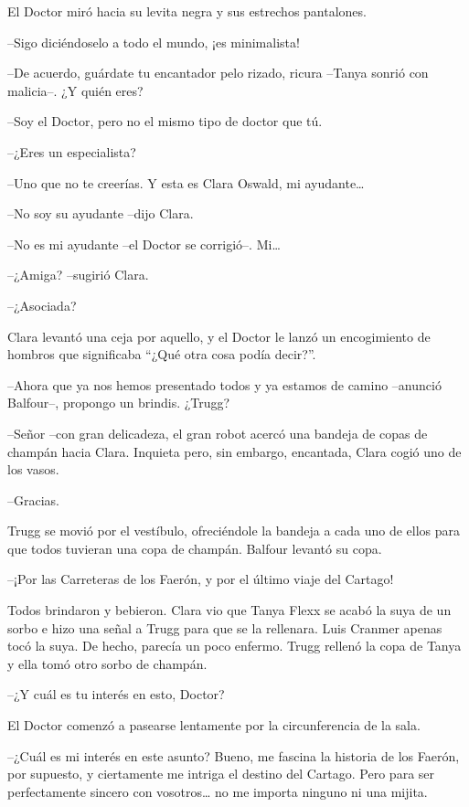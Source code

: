 {El Doctor miró hacia su levita negra y sus estrechos pantalones.}

{--Sigo diciéndoselo a todo el mundo, ¡es minimalista!}

{--De acuerdo, guárdate tu encantador pelo rizado, ricura --Tanya sonrió
con malicia--. ¿Y quién eres?}

{--Soy el Doctor, pero no el mismo tipo de doctor que tú.}

{--¿Eres un especialista?}

{--Uno que no te creerías. Y esta es Clara Oswald, mi ayudante\ldots{}}

{--No soy su ayudante --dijo Clara.}

{--No es mi ayudante --el Doctor se corrigió--. Mi\ldots{}}

{--¿Amiga? --sugirió Clara.}

{--¿Asociada?}

{Clara levantó una ceja por aquello, y el Doctor le lanzó un encogimiento
de hombros que significaba ``¿Qué otra cosa podía decir?''.}

{--Ahora que ya nos hemos presentado todos y ya estamos de camino
--anunció Balfour--, propongo un brindis. ¿Trugg?}

{--Señor --con gran delicadeza, el gran robot acercó una bandeja de copas
 de champán hacia Clara. Inquieta pero, sin embargo, encantada, Clara
cogió uno de los vasos.}

{--Gracias.}

{Trugg se movió por el vestíbulo, ofreciéndole la bandeja a cada uno de
 ellos para que todos tuvieran una copa de champán. Balfour levantó su
copa.}

{--¡Por las Carreteras de los Faerón, y por el último viaje del
Cartago!}

{Todos brindaron y bebieron. Clara vio que Tanya Flexx se acabó la suya
 de un sorbo e hizo una señal a Trugg para que se la rellenara. Luis
 Cranmer apenas tocó la suya. De hecho, parecía un poco enfermo. Trugg
rellenó la copa de Tanya y ella tomó otro sorbo de champán.}

{--¿Y cuál es tu interés en esto, Doctor?}

{El Doctor comenzó a pasearse lentamente por la circunferencia de la
sala.}

{--¿Cuál es mi interés en este asunto? Bueno, me fascina la historia de
 los Faerón, por supuesto, y ciertamente me intriga el destino del
 Cartago. Pero para ser perfectamente sincero con vosotros\ldots{} no me
importa ninguno ni una mijita.}

